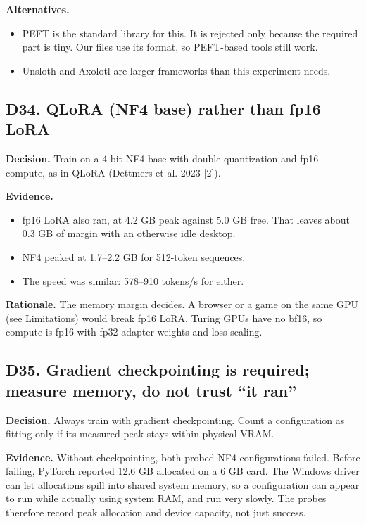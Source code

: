 \documentclass[11pt,a4paper]{article}
\begin{document}
\textbf{Alternatives.}

\begin{itemize}
\item PEFT is the standard library for this. It is rejected only because the required part is tiny. Our files use its format, so PEFT-based tools still work.
\item Unsloth and Axolotl are larger frameworks than this experiment needs.
\end{itemize}

\subsection{D34. QLoRA (NF4 base) rather than fp16 LoRA}

\textbf{Decision.} Train on a 4-bit NF4 base with double quantization and fp16 compute, as in QLoRA (Dettmers et al. 2023 [2]).

\textbf{Evidence.}

\begin{itemize}
\item fp16 LoRA also ran, at 4.2 GB peak against 5.0 GB free. That leaves about 0.3 GB of margin with an otherwise idle desktop.
\item NF4 peaked at 1.7--2.2 GB for 512-token sequences.
\item The speed was similar: 578--910 tokens/s for either.
\end{itemize}

\textbf{Rationale.} The memory margin decides. A browser or a game on the same GPU (see Limitations) would break fp16 LoRA. Turing GPUs have no bf16, so compute is fp16 with fp32 adapter weights and loss scaling.

\subsection{D35. Gradient checkpointing is required; measure memory, do not trust ``it ran''}

\textbf{Decision.} Always train with gradient checkpointing. Count a configuration as fitting only if its measured peak stays within physical VRAM.

\textbf{Evidence.} Without checkpointing, both probed NF4 configurations failed. Before failing, PyTorch reported 12.6 GB allocated on a 6 GB card. The Windows driver can let allocations spill into shared system memory, so a configuration can appear to run while actually using system RAM, and run very slowly. The probes therefore record peak allocation and device capacity, not just success.
\end{document}
